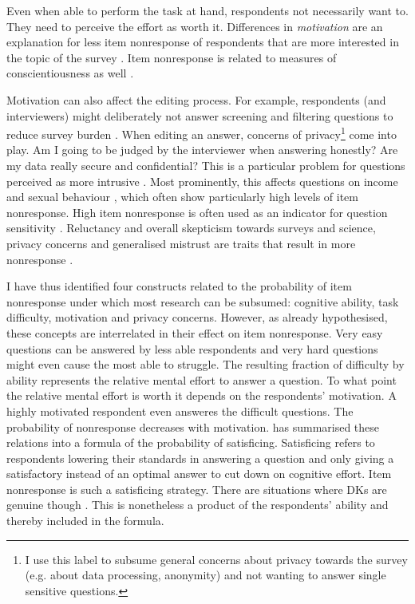 \documentclass[a4paper,12pt]{article}
\begin{document}
Even when able to perform the task at hand, respondents not necessarily want to.
They need to perceive the effort as worth it. Differences in \textit{motivation} are an explanation
for less item nonresponse of respondents that are more interested in the topic of the survey \citep{kochItemNonresponseEuropean2009, silberEffectsQuestionRespondent2021}. Item nonresponse is related to measures of conscientiousness as well \citep{hedengrenDogThatDidn2012}.

Motivation can also affect the editing process. For example, respondents (and interviewers) might deliberately not answer screening and filtering questions to reduce survey burden \citep{tourangeauMotivatedMisreportingShaping2015}.
When editing an answer, concerns of privacy\footnote{I use this label to subsume general concerns about privacy towards the survey (e.g. about data processing, anonymity) and not wanting to answer single sensitive questions.} come into play. Am I going to be judged by the interviewer when answering honestly? Are my data really secure and confidential? This is a particular problem for questions perceived as more intrusive \citep{tourangeauSensitiveQuestionsSurveys2007}. Most prominently, this affects questions on income \citep{yanTrendsIncomeNonresponse2010} and sexual behaviour \citep{kupekDeterminantsItemNonresponse1998}, which often show particularly high levels of item nonresponse. High item nonresponse is often used as an indicator for question sensitivity \citep{tourangeauSensitiveQuestionsSurveys2007}. Reluctancy and overall skepticism towards surveys and science, privacy concerns and generalised mistrust are traits that result in more nonresponse \citep{silberEffectsQuestionRespondent2021}.

\bigskip

I have thus identified four constructs related to the probability of item nonresponse under which most research can be subsumed: cognitive ability, task difficulty, motivation and privacy concerns. However, as \citet{krosnickResponseStrategiesCoping1991} already hypothesised, these concepts are interrelated in their effect on item nonresponse. Very easy questions can be answered by less able respondents and very hard questions might even cause the most able to struggle. The resulting fraction of difficulty by ability represents the relative mental effort to answer a question. To what point the relative mental effort is worth it depends on the respondents' motivation. A highly motivated respondent even answeres the difficult questions. The probability of nonresponse decreases with motivation. \citet[225]{krosnickResponseStrategiesCoping1991} has summarised these relations into a formula of the probability of satisficing. Satisficing refers to respondents lowering their standards in answering a question and only giving a satisfactory instead of an optimal answer to cut down on cognitive effort. Item nonresponse is such a satisficing strategy. There are situations where DKs are genuine though \citep{turnerCanResponseLatencies2015}. This is nonetheless a product of the respondents' ability and thereby included in the formula.
\end{document}
